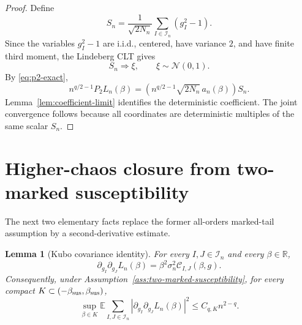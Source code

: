 \documentclass[11pt]{article}
\newtheorem{lemma}[theorem]{Lemma}
\newcommand{\E}{\mathbb{E}}
\newcommand{\N}{\mathcal{N}}
\newcommand{\R}{\mathbb{R}}
\newcommand{\calI}{\mathcal{I}}
\begin{document}
\begin{proof}
  Define
  \begin{equation}\label{eq:Sn}
    S_n=
    \frac1{\sqrt{2N_n}}
    \sum_{I\in\calI_n}(g_I^2-1).
  \end{equation}
  Since the variables $g_I^2-1$ are i.i.d., centered, have variance $2$, and
  have finite third moment, the Lindeberg CLT gives
  \begin{equation}\label{eq:Sn-clt}
    S_n\Rightarrow\xi,
    \qquad
    \xi\sim\N(0,1).
  \end{equation}
  By \eqref{eq:p2-exact},
  \begin{equation}\label{eq:p2-Sn}
    n^{q/2-1}P_2L_n(\beta)
    =
    \left(n^{q/2-1}\sqrt{2N_n}\,a_n(\beta)\right)S_n.
  \end{equation}
  Lemma~\ref{lem:coefficient-limit} identifies the deterministic coefficient.
  The joint convergence follows because all coordinates are deterministic
  multiples of the same scalar $S_n$.
\end{proof}

\section{Higher-chaos closure from two-marked susceptibility}

The next two elementary facts replace the former all-orders marked-tail
assumption by a second-derivative estimate.

\begin{lemma}[Kubo covariance identity]
  \label{lem:kubo-hessian}
  For every $I,J\in\calI_n$ and every $\beta\in\R$,
  \begin{equation}\label{eq:hessian-kubo}
    \partial_{g_I}\partial_{g_J}L_n(\beta)
    =
    \beta^2\sigma_n^2\mathcal C_{I,J}(\beta,g).
  \end{equation}
  Consequently, under Assumption~\ref{ass:two-marked-susceptibility}, for
  every compact $K\subset(-\beta_{\rm sus},\beta_{\rm sus})$,
  \begin{equation}\label{eq:hessian-hs-bound}
    \sup_{\beta\in K}
    \E
    \sum_{I,J\in\calI_n}
    \left|
      \partial_{g_I}\partial_{g_J}L_n(\beta)
    \right|^2
    \leq
    C_{q,K}n^{2-q}.
  \end{equation}
\end{lemma}
\end{document}
